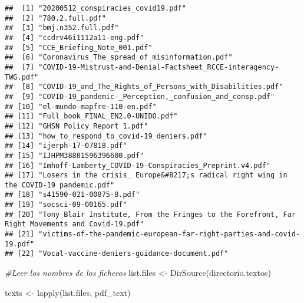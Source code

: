 \documentclass[
]{book}
\newenvironment{Shaded}{\begin{snugshade}}{\end{snugshade}}
\newcommand{\CommentTok}[1]{\textcolor[rgb]{0.56,0.35,0.01}{\textit{#1}}}
\newcommand{\FunctionTok}[1]{\textcolor[rgb]{0.00,0.00,0.00}{#1}}
\newcommand{\NormalTok}[1]{#1}
\newcommand{\OtherTok}[1]{\textcolor[rgb]{0.56,0.35,0.01}{#1}}
\begin{document}
\begin{verbatim}
##  [1] "20200512_conspiracies_covid19.pdf"                                                            
##  [2] "780.2.full.pdf"                                                                               
##  [3] "bmj.n352.full.pdf"                                                                            
##  [4] "ccdrv46i1112a11-eng.pdf"                                                                      
##  [5] "CCE_Briefing_Note_001.pdf"                                                                    
##  [6] "Coronavirus_The_spread_of_misinformation.pdf"                                                 
##  [7] "COVID-19-Mistrust-and-Denial-Factsheet_RCCE-interagency-TWG.pdf"                              
##  [8] "COVID-19_and_The_Rights_of_Persons_with_Disabilities.pdf"                                     
##  [9] "COVID-19_pandemic-_Perception,_confusion_and_consp.pdf"                                       
## [10] "el-mundo-mapfre-110-en.pdf"                                                                   
## [11] "Full_book_FINAL_EN2.0-UNIDO.pdf"                                                              
## [12] "GHSN Policy Report 1.pdf"                                                                     
## [13] "how_to_respond_to_covid-19_deniers.pdf"                                                       
## [14] "ijerph-17-07818.pdf"                                                                          
## [15] "IJHPM38801596396600.pdf"                                                                      
## [16] "Imhoff-Lamberty_COVID-19-Conspiracies_Preprint.v4.pdf"                                        
## [17] "Losers in the crisis_ Europe&#8217;s radical right wing in the COVID-19 pandemic.pdf"         
## [18] "s41590-021-00875-8.pdf"                                                                       
## [19] "socsci-09-00165.pdf"                                                                          
## [20] "Tony Blair Institute, From the Fringes to the Forefront, Far Right Movements and Covid-19.pdf"
## [21] "victims-of-the-pandemic-european-far-right-parties-and-covid-19.pdf"                          
## [22] "Vocal-vaccine-deniers-guidance-document.pdf"
\end{verbatim}

\begin{Shaded}
\begin{Highlighting}[]
\CommentTok{\#Leer los nombres de los ficheros}
\NormalTok{list.files }\OtherTok{\textless{}{-}} \FunctionTok{DirSource}\NormalTok{(directorio.textos)}

\NormalTok{texts }\OtherTok{\textless{}{-}} \FunctionTok{lapply}\NormalTok{(list.files, pdf\_text) }
\end{Highlighting}
\end{Shaded}
\end{document}
